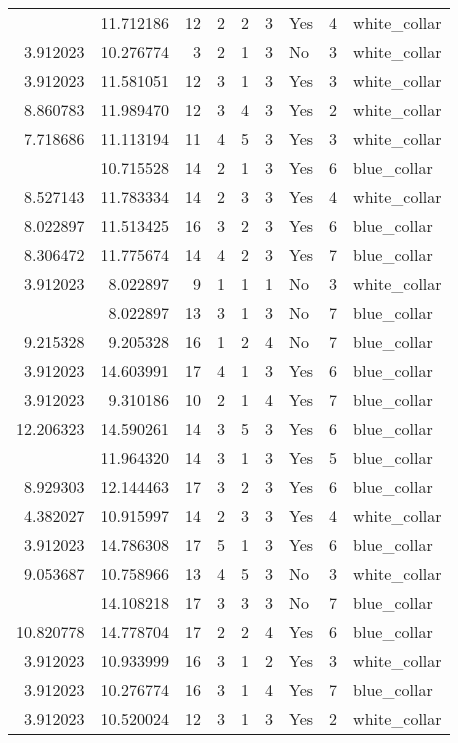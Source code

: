\documentclass[
]{article}
\begin{document}
\begin{longtable}[t]{rrrrrllrl}
\addlinespace
9.215328 & 11.712186 & 12 & 2 & 2 & 3 & Yes & 4 & white\_collar\\
3.912023 & 10.276774 & 3 & 2 & 1 & 3 & No & 3 & white\_collar\\
3.912023 & 11.581051 & 12 & 3 & 1 & 3 & Yes & 3 & white\_collar\\
8.860783 & 11.989470 & 12 & 3 & 4 & 3 & Yes & 2 & white\_collar\\
7.718686 & 11.113194 & 11 & 4 & 5 & 3 & Yes & 3 & white\_collar\\
\addlinespace
3.912023 & 10.715528 & 14 & 2 & 1 & 3 & Yes & 6 & blue\_collar\\
8.527143 & 11.783334 & 14 & 2 & 3 & 3 & Yes & 4 & white\_collar\\
8.022897 & 11.513425 & 16 & 3 & 2 & 3 & Yes & 6 & blue\_collar\\
8.306472 & 11.775674 & 14 & 4 & 2 & 3 & Yes & 7 & blue\_collar\\
3.912023 & 8.022897 & 9 & 1 & 1 & 1 & No & 3 & white\_collar\\
\addlinespace
3.912023 & 8.022897 & 13 & 3 & 1 & 3 & No & 7 & blue\_collar\\
9.215328 & 9.205328 & 16 & 1 & 2 & 4 & No & 7 & blue\_collar\\
3.912023 & 14.603991 & 17 & 4 & 1 & 3 & Yes & 6 & blue\_collar\\
3.912023 & 9.310186 & 10 & 2 & 1 & 4 & Yes & 7 & blue\_collar\\
12.206323 & 14.590261 & 14 & 3 & 5 & 3 & Yes & 6 & blue\_collar\\
\addlinespace
3.912023 & 11.964320 & 14 & 3 & 1 & 3 & Yes & 5 & blue\_collar\\
8.929303 & 12.144463 & 17 & 3 & 2 & 3 & Yes & 6 & blue\_collar\\
4.382027 & 10.915997 & 14 & 2 & 3 & 3 & Yes & 4 & white\_collar\\
3.912023 & 14.786308 & 17 & 5 & 1 & 3 & Yes & 6 & blue\_collar\\
9.053687 & 10.758966 & 13 & 4 & 5 & 3 & No & 3 & white\_collar\\
\addlinespace
10.128629 & 14.108218 & 17 & 3 & 3 & 3 & No & 7 & blue\_collar\\
10.820778 & 14.778704 & 17 & 2 & 2 & 4 & Yes & 6 & blue\_collar\\
3.912023 & 10.933999 & 16 & 3 & 1 & 2 & Yes & 3 & white\_collar\\
3.912023 & 10.276774 & 16 & 3 & 1 & 4 & Yes & 7 & blue\_collar\\
3.912023 & 10.520024 & 12 & 3 & 1 & 3 & Yes & 2 & white\_collar\\

\end{longtable}
\end{document}
